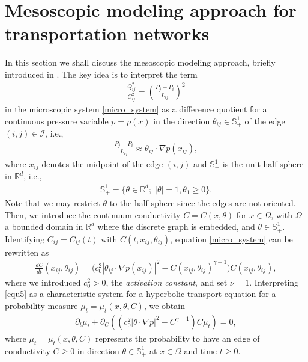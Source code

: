 \documentclass{article}
\numberwithin{equation}{section}
\newcommand{\R}{\mathbb{R}}
\def\[{\begin{eqnarray*}}
\def\]{\end{eqnarray*}}
\begin{document}
\section{Mesoscopic modeling approach for transportation networks}\label{sec:mesoscopic}
In this section we shall discuss the mesoscopic modeling approach, briefly introduced in \cite{albi2017continuum}.
The key idea is to interpret the term
\[
   \frac{Q_{ij}^2 }{C_{ij}^2} = \left(\frac{P_j-P_i}{L_{ij}}\right)^2
\]
in the microscopic system \eqref{micro_system} as a difference quotient for a continuous pressure variable
$p=p(x)$ in the direction $\theta_{ij}\in \mathbb{S}^1_+$ of the edge $(i,j)\in\mathcal{I}$, i.e.,
\[
   \frac{P_j-P_i}{L_{ij}} \approx \theta_{ij} \cdot \nabla p(x_{ij}),
\]
where $x_{ij}$ denotes the midpoint of the edge $(i,j)$ and $\mathbb{S}^1_+$ is the unit half-sphere in $\R^d$, i.e.,
\begin{align}
   \mathbb{S}_+^1 = \{\theta \in \R^d;\; |\theta|=1, \theta_1\geq 0\}.
\end{align}
Note that we may restrict $\theta$ to the half-sphere since the edges are not oriented.
Then, we introduce the continuum conductivity $C=C(x,\theta)$ for $x\in\Omega$, with $\Omega$ a bounded domain in $\R^d$
where the discrete graph is embedded, and $\theta\in \mathbb{S}^1_+$.
Identifying $C_{ij}=C_{ij}(t)$ with $C(t,x_{ij}, \theta_{ij})$, equation \eqref{micro_system} can be rewritten as
\begin{align}\label{equ5}
   \frac{dC}{dt}(x_{ij},\theta_{ij}) =  \bigl( c_0^2 |\theta_{ij}\cdot \nabla p(x_{ij})|^2 - C(x_{ij},\theta_{ij})^{\gamma-1} \bigr)  C(x_{ij},\theta_{ij}),
\end{align}
where we introduced $c_0^2>0$, the \emph{activation constant}, and set $\nu=1$.
Interpreting \eqref{equ5} as a characteristic system for a hyperbolic transport equation for
a probability measure $\mu_t=\mu_t(x,\theta,C)$, we obtain
\begin{align}\label{meso_system1}
   \partial_t \mu_t + \partial_C \left( (c_0^2 |\theta \cdot \nabla p|^2 -C^{\gamma-1}) C \mu_t \right) = 0,
\end{align}
where $\mu_t=\mu_t(x,\theta,C)$ represents the probability to have an edge of conductivity $C\geq 0$ in direction $\theta\in\mathbb{S}^1_+$
at $x\in\Omega$ and time $t\geq 0$.
\end{document}
